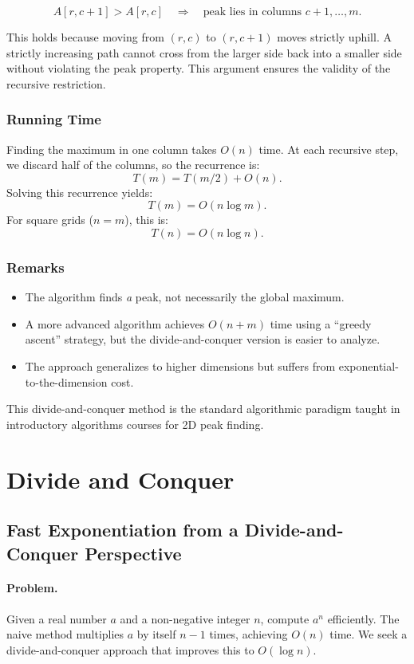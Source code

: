 \documentclass[9pt]{extarticle}
\begin{document}
\[
A[r,c+1] > A[r,c]
\quad\Longrightarrow\quad
\text{peak lies in columns } c+1,\ldots,m.
\]

This holds because moving from \((r,c)\) to \((r,c+1)\) moves strictly uphill.
A strictly increasing path cannot cross from the larger side back into a
smaller side without violating the peak property. This argument ensures the
validity of the recursive restriction.

\subsubsection*{Running Time}
Finding the maximum in one column takes \(O(n)\) time.  
At each recursive step, we discard half of the columns, so the recurrence is:
\[
T(m) = T(m/2) + O(n).
\]
Solving this recurrence yields:
\[
T(m) = O(n \log m).
\]
For square grids (\(n=m\)), this is:
\[
T(n) = O(n \log n).
\]

\subsubsection*{Remarks}
\begin{itemize}
    \item The algorithm finds \emph{a} peak, not necessarily the global maximum.
    \item A more advanced algorithm achieves \(O(n + m)\) time using a
          ``greedy ascent'' strategy, but the divide-and-conquer version is easier to analyze.
    \item The approach generalizes to higher dimensions but suffers from
          exponential-to-the-dimension cost.
\end{itemize}

This divide-and-conquer method is the standard algorithmic paradigm taught in
introductory algorithms courses for 2D peak finding.


\newpage
\section{Divide and Conquer}
\subsection{Fast Exponentiation from a Divide-and-Conquer Perspective}

\paragraph{Problem.}
Given a real number $a$ and a non-negative integer $n$, compute $a^n$ efficiently.
The naive method multiplies $a$ by itself $n-1$ times, achieving $O(n)$ time.
We seek a divide-and-conquer approach that improves this to $O(\log n)$.
\end{document}
